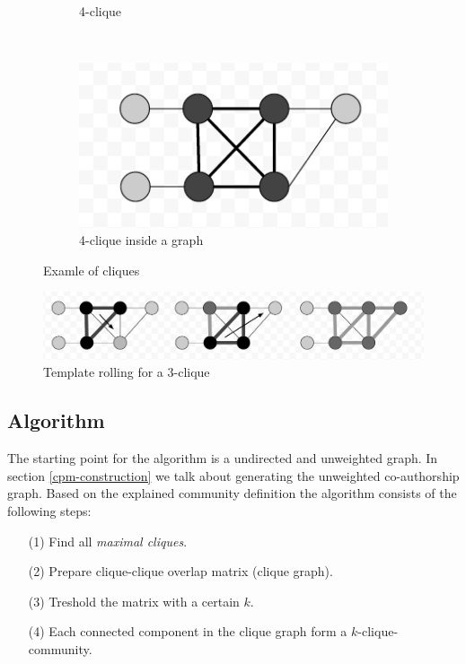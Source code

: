 \documentclass[runningheads,a4paper]{llncs}
\begin{document}
\begin{figure}
\begin{subfigure}[b]{0.3\textwidth}
        \caption{4-clique}
        \label{fig:4clique}
    \end{subfigure}
    ~ %
    \begin{subfigure}[b]{0.3\textwidth}
        \includegraphics[width=\textwidth]{cliqueinside}
        \caption{4-clique inside a graph}
        \label{fig:cliqueInside}
    \end{subfigure}
    \caption{Examle of cliques}\label{fig:cliques}
\end{figure}

\begin{figure}
	\includegraphics[width=\textwidth]{rolling.png}
	\caption{Template rolling for a $3$-clique}
	\label{fig:rolling}
\end{figure}

\subsection{Algorithm}
\label{cpm-algo}
The starting point for the algorithm is a undirected and unweighted graph. In section \ref{cpm-construction} we talk about generating the  unweighted co-authorship graph.
Based on the explained community definition the algorithm consists of the following steps:

\begin{enumerate}
\small
\item[(1)] Find all \emph{maximal cliques}.
\item[(2)] Prepare clique-clique overlap matrix (clique graph).
\item[(3)] Treshold the matrix with a certain $k$.
\item[(4)] Each connected component in the clique graph form a $k$-clique-community.
\end{enumerate}
\end{document}
